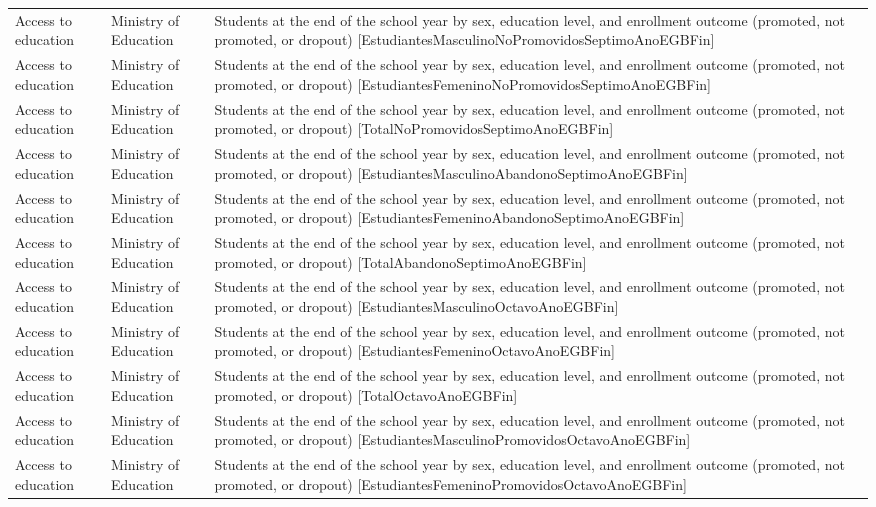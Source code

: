 \documentclass[10pt,a4paper]{article}
\begin{document}
\begin{longtable}{@{}>{\raggedright\arraybackslash}p{3.5cm}>{\raggedright\arraybackslash}p{5.6cm}>{\raggedright\arraybackslash}p{\dimexpr\textwidth-9.1cm-4\tabcolsep\relax}@{}}
Access to education & Ministry of Education & Students at the end of the school year by sex, education level, and enrollment outcome (promoted, not promoted, or dropout) [EstudiantesMasculinoNoPromovidosSeptimoAnoEGBFin]\\
Access to education & Ministry of Education & Students at the end of the school year by sex, education level, and enrollment outcome (promoted, not promoted, or dropout) [EstudiantesFemeninoNoPromovidosSeptimoAnoEGBFin]\\
Access to education & Ministry of Education & Students at the end of the school year by sex, education level, and enrollment outcome (promoted, not promoted, or dropout) [TotalNoPromovidosSeptimoAnoEGBFin]\\
Access to education & Ministry of Education & Students at the end of the school year by sex, education level, and enrollment outcome (promoted, not promoted, or dropout) [EstudiantesMasculinoAbandonoSeptimoAnoEGBFin]\\
Access to education & Ministry of Education & Students at the end of the school year by sex, education level, and enrollment outcome (promoted, not promoted, or dropout) [EstudiantesFemeninoAbandonoSeptimoAnoEGBFin]\\
Access to education & Ministry of Education & Students at the end of the school year by sex, education level, and enrollment outcome (promoted, not promoted, or dropout) [TotalAbandonoSeptimoAnoEGBFin]\\
Access to education & Ministry of Education & Students at the end of the school year by sex, education level, and enrollment outcome (promoted, not promoted, or dropout) [EstudiantesMasculinoOctavoAnoEGBFin]\\
Access to education & Ministry of Education & Students at the end of the school year by sex, education level, and enrollment outcome (promoted, not promoted, or dropout) [EstudiantesFemeninoOctavoAnoEGBFin]\\
Access to education & Ministry of Education & Students at the end of the school year by sex, education level, and enrollment outcome (promoted, not promoted, or dropout) [TotalOctavoAnoEGBFin]\\
Access to education & Ministry of Education & Students at the end of the school year by sex, education level, and enrollment outcome (promoted, not promoted, or dropout) [EstudiantesMasculinoPromovidosOctavoAnoEGBFin]\\
Access to education & Ministry of Education & Students at the end of the school year by sex, education level, and enrollment outcome (promoted, not promoted, or dropout) [EstudiantesFemeninoPromovidosOctavoAnoEGBFin]\\

\end{longtable}
\end{document}
